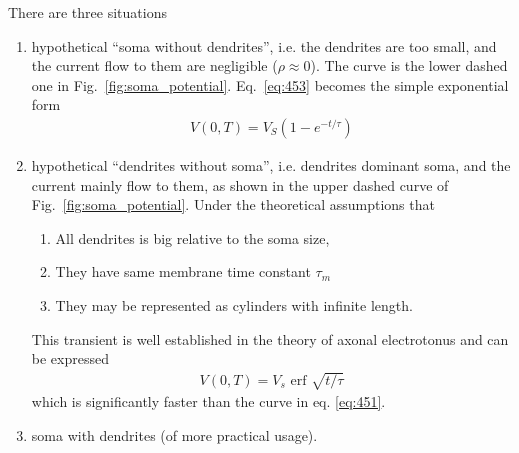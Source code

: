 There are three situations
\begin{enumerate}
\item hypothetical ``soma without dendrites'', i.e. the dendrites are
  too small, and the current flow to them are negligible 
  ($\rho \approx 0$). The curve is the lower dashed one in
  Fig.~\ref{fig:soma_potential}. Eq.~\eqref{eq:453} becomes the simple
  exponential form
  \begin{eqnarray}
    \label{eq:451}
   V(0,T) = V_S(1-e^{-t/\tau})
  \end{eqnarray}

\item hypothetical ``dendrites without soma'', i.e. dendrites dominant
  soma, and the current mainly flow to them, as shown in the upper
  dashed curve of Fig.~\ref{fig:soma_potential}. Under the theoretical
  assumptions that
\begin{enumerate}
\item All dendrites is big relative to the soma size,
\item They have same membrane time constant $\tau_m$
\item They may be represented as cylinders with infinite length. 
\end{enumerate}
This transient is well established in the theory of axonal
electrotonus and can be expressed
\begin{eqnarray*}
  V(0,T) = V_s \text{ erf } \sqrt{t/\tau}
\end{eqnarray*}
which is significantly faster than the curve in eq. \eqref{eq:451}.

\item soma with dendrites (of more practical usage). 


\end{enumerate}
